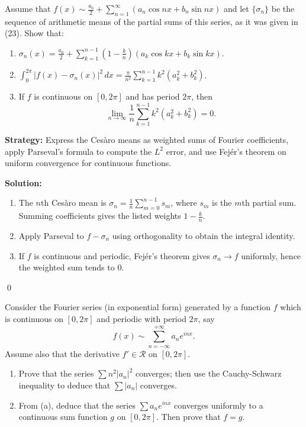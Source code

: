 \begin{problembox}
Assume that $f(x) \sim \frac{a_0}{2} + \sum_{n=1}^\infty (a_n \cos nx + b_n \sin nx)$ and let $\{\sigma_n\}$ be the sequence of arithmetic means of the partial sums of this series, as it was given in (23). Show that:
\begin{enumerate}[label=(\alph*)]
\item $\sigma_n(x) = \frac{a_0}{2} + \sum_{k=1}^{n-1} \left(1 - \frac{k}{n}\right) (a_k \cos kx + b_k \sin kx)$.
\item $\int_0^{2\pi} |f(x) - \sigma_n(x)|^2 \, dx = \frac{\pi}{n^2} \sum_{k=1}^{n-1} k^2 (a_k^2 + b_k^2)$.
\item If $f$ is continuous on $[0, 2\pi]$ and has period $2\pi$, then
\[
\lim_{n \to \infty} \frac{1}{n} \sum_{k=1}^{n-1} k^2 (a_k^2 + b_k^2) = 0.
\]
\end{enumerate}
\end{problembox}

\noindent\textbf{Strategy:} Express the Cesàro means as weighted sums of Fourier coefficients, apply Parseval's formula to compute the $L^2$ error, and use Fejér's theorem on uniform convergence for continuous functions.

\bigskip\noindent\textbf{Solution:}
\begin{enumerate}[label=(\alph*)]
\item The $n$th Cesàro mean is $\sigma_n=\tfrac{1}{n}\sum_{m=0}^{n-1} s_m$, where $s_m$ is the $m$th partial sum. Summing coefficients gives the listed weights $1-\tfrac{k}{n}$.
\item Apply Parseval to $f-\sigma_n$ using orthogonality to obtain the integral identity.
\item If $f$ is continuous and periodic, Fejér's theorem gives $\sigma_n\to f$ uniformly, hence the weighted sum tends to $0$.
\end{enumerate}\qed


\begin{problembox}
Consider the Fourier series (in exponential form) generated by a function $f$ which is continuous on $[0, 2\pi]$ and periodic with period $2\pi$, say
\[
f(x) \sim \sum_{n=-\infty}^{+\infty} a_n e^{inx}.
\]
Assume also that the derivative $f' \in \mathcal{R}$ on $[0, 2\pi]$. 
\begin{enumerate}[label=(\alph*)]
\item Prove that the series $\sum n^2 |a_n|^2$ converges; then use the Cauchy-Schwarz inequality to deduce that $\sum |a_n|$ converges.
\item From (a), deduce that the series $\sum a_n e^{inx}$ converges uniformly to a continuous sum function $g$ on $[0, 2\pi]$. Then prove that $f = g$.
\end{enumerate}
\end{problembox}

